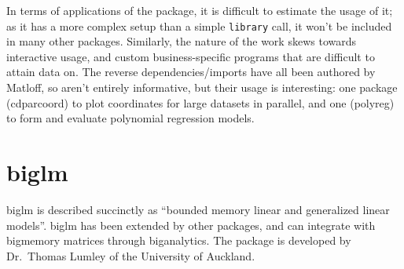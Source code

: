 \documentclass[10pt,a4paper]{article}
\begin{document}
In terms of applications of the package, it is difficult to estimate
the usage of it; as it has a more complex setup than a simple
\texttt{library} call, it won't be included in many other packages.
Similarly, the nature of the work skews towards interactive usage, and
custom business-specific programs that are difficult to attain data
on. The reverse dependencies/imports have all been authored by
Matloff, so aren't entirely informative, but their usage is
interesting: one package (cdparcoord) to plot coordinates for large
datasets in parallel, and one (polyreg) to form and evaluate
polynomial regression models.

\section{biglm}
\label{sec:biglm}

biglm is described succinctly as \enquote{bounded memory linear and
	generalized linear models}\cite{lumley13}. biglm has been extended
by other packages, and can integrate with bigmemory matrices through
biganalytics. The package is developed by Dr.~Thomas Lumley of the
University of Auckland.


\printbibliography{}
\end{document}
